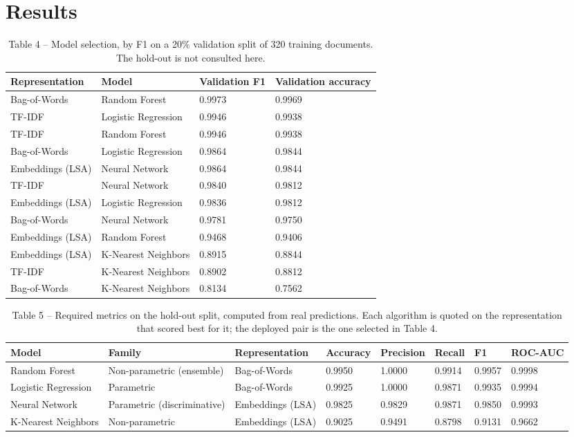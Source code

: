 \documentclass[conference,a4paper]{IEEEtran}
\begin{document}
\section{Results}

\begin{table}[!t]
  \centering
  \small
  \caption{Table 4 -- Model selection, by F1 on a 20\% validation split of 320 training documents. The hold-out is not consulted here.}
  \label{tab:table4modelselectionbyf1ona2}
  \begin{tabular}{llll}
    \toprule
    Representation & Model & Validation F1 & Validation accuracy \\
    \midrule
    Bag-of-Words & Random Forest & 0.9973 & 0.9969 \\
    TF-IDF & Logistic Regression & 0.9946 & 0.9938 \\
    TF-IDF & Random Forest & 0.9946 & 0.9938 \\
    Bag-of-Words & Logistic Regression & 0.9864 & 0.9844 \\
    Embeddings (LSA) & Neural Network & 0.9864 & 0.9844 \\
    TF-IDF & Neural Network & 0.9840 & 0.9812 \\
    Embeddings (LSA) & Logistic Regression & 0.9836 & 0.9812 \\
    Bag-of-Words & Neural Network & 0.9781 & 0.9750 \\
    Embeddings (LSA) & Random Forest & 0.9468 & 0.9406 \\
    Embeddings (LSA) & K-Nearest Neighbors & 0.8915 & 0.8844 \\
    TF-IDF & K-Nearest Neighbors & 0.8902 & 0.8812 \\
    Bag-of-Words & K-Nearest Neighbors & 0.8134 & 0.7562 \\
    \bottomrule
  \end{tabular}
\end{table}

\begin{table}[!t]
  \centering
  \footnotesize
  \caption{Table 5 -- Required metrics on the hold-out split, computed from real predictions. Each algorithm is quoted on the representation that scored best for it; the deployed pair is the one selected in Table 4.}
  \label{tab:table5requiredmetricsontheho}
  \begin{tabular}{llllllll}
    \toprule
    Model & Family & Representation & Accuracy & Precision & Recall & F1 & ROC-AUC \\
    \midrule
    Random Forest & Non-parametric (ensemble) & Bag-of-Words & 0.9950 & 1.0000 & 0.9914 & 0.9957 & 0.9998 \\
    Logistic Regression & Parametric & Bag-of-Words & 0.9925 & 1.0000 & 0.9871 & 0.9935 & 0.9994 \\
    Neural Network & Parametric (discriminative) & Embeddings (LSA) & 0.9825 & 0.9829 & 0.9871 & 0.9850 & 0.9993 \\
    K-Nearest Neighbors & Non-parametric & Embeddings (LSA) & 0.9025 & 0.9491 & 0.8798 & 0.9131 & 0.9662 \\
    \bottomrule
  \end{tabular}
\end{table}
\end{document}
